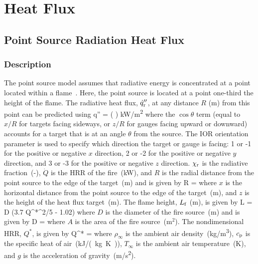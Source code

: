 
\chapter{Heat Flux}
\label{Heat_Flux_Chapter}

\section{Point Source Radiation Heat Flux}

\subsection*{Description}

The point source model assumes that radiative energy is concentrated at a point located within a flame~\cite{Beyler2:SFPE}.
Here, the point source is located at a point one-third the height of the flame.
The radiative heat flux, $\dot q''\sb{r}$, at any distance $R$ (\si{m}) from this point can be predicted using
\be
\dot q'' = \cos\theta \left(  \right) \quad \si{kW/m^2}
\label{eq:point_source}
\ee
where the $\cos\theta$ term (equal to $x/R$ for targets facing sideways, or $z/R$ for gauges facing upward or downward) accounts for a target that is at an angle $\theta$ from the source. The IOR orientation parameter is used to specify which direction the target or gauge is facing: 1 or -1 for the positive or negative $x$ direction, 2 or -2 for the positive or negative $y$ direction, and 3 or -3 for the positive or negative $z$ direction. $\chi\sb{r}$ is the radiative fraction~(-), $\dot Q$ is the HRR of the fire~(\si{kW}), and $R$ is the radial distance from the point source to the edge of the target~(\si{m}) and is given by
\be
R = 
\label{eq:point_source_R}
\ee
where $x$ is the horizontal distance from the point source to the edge of the target~(\si{m}), and $z$ is the height of the heat flux target~(\si{m}). The flame height, $L\sb{f}$ (\si{m}), is given by
\be
L = D (3.7 Q^{*^{2/5}} - 1.02)
\label{eq:point_source_Lf}
\ee
where $D$ is the diameter of the fire source~(\si{m}) and is given by
\be
D = 
\label{eq:point_source_D}
\ee
where $A$ is the area of the fire source~(m$^2$). The nondimensional HRR, $Q^*$, is given by
\be
Q^* = 
\label{eq:point_source_Qstar}
\ee
where $\rho_\infty$ is the ambient air density~(\si{kg/m^3}), $c\sb{p}$ is the specific heat of air~(\si{kJ/(kg.K)}), $T_\infty$ is the ambient air temperature~(\si{K}), and $g$ is the acceleration of gravity~(\si{m/s^2}).


